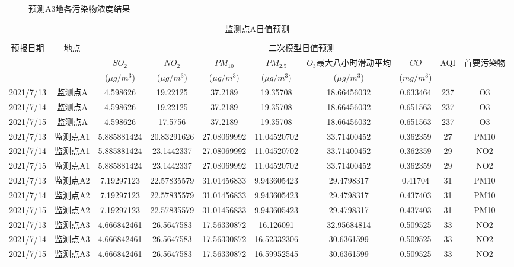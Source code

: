 \documentclass[a4paper,10pt]{my_paper}
\numberwithin{equation}{section}
\begin{document}
\begin{figure}[htbp]
\begin{minipage}[c]{0.3\textwidth}
		\end{minipage}
\caption{预测A3地各污染物浓度结果}\label{fig_Q3A3地预测图}
\end{figure}

\begin{table}[htbp]
  \centering\footnotesize
  \caption{监测点A日值预测}\label{tab_Q4_AQI}%
    \begin{tabular}{cccccccccc}
    \toprule
    \multirow{3}[2]{*}{预报日期} & \multirow{3}[2]{*}{地点} & \multicolumn{8}{c}{二次模型日值预测} \\
          &       & ${SO_2}$   & ${NO_2}$   & ${PM_10}$  & ${PM_{2.5}}$  & ${O_3}$最大八小时滑动平均 & ${CO}$    & \multicolumn{1}{c}{\multirow{2}[1]{*}{AQI}} & \multicolumn{1}{c}{\multirow{2}[1]{*}{首要污染物}} \\
          &       & (${\mu g/m^3}$) & (${\mu g/m^3}$) & (${\mu g/m^3}$) & (${\mu g/m^3}$) &  (${\mu g/m^3}$) &  (${mg/m^3}$) &       &  \\
    \midrule
    2021/7/13 & 监测点A  & 4.598626 & 19.22125 & 37.2189 & 19.35708 & 18.66456032 & 0.633464 & 237   & O3 \\
    2021/7/14 & 监测点A  & 4.598626 & 19.22125 & 37.2189 & 19.35708 & 18.66456032 & 0.651563 & 237   & O3 \\
    2021/7/15 & 监测点A  & 4.598626 & 17.5756 & 37.2189 & 19.35708 & 18.66456032 & 0.651563 & 237   & O3 \\
    2021/7/13 & 监测点A1 & 5.885881424 & 20.83291626 & 27.08069992 & 11.04520702 & 33.71400452 & 0.362359 & 27    & PM10 \\
    2021/7/14 & 监测点A1 & 5.885881424 & 23.1442337 & 27.08069992 & 11.04520702 & 33.71400452 & 0.362359 & 29    & NO2 \\
    2021/7/15 & 监测点A1 & 5.885881424 & 23.1442337 & 27.08069992 & 11.04520702 & 33.71400452 & 0.362359 & 29    & NO2 \\
    2021/7/13 & 监测点A2 & 7.19297123 & 22.57835579 & 31.01456833 & 9.943605423 & 29.4798317 & 0.41704 & 31    & PM10 \\
    2021/7/14 & 监测点A2 & 7.19297123 & 22.57835579 & 31.01456833 & 9.943605423 & 29.4798317 & 0.437403 & 31    & PM10 \\
    2021/7/15 & 监测点A2 & 7.19297123 & 22.57835579 & 31.01456833 & 9.943605423 & 29.4798317 & 0.437403 & 31    & PM10 \\
    2021/7/13 & 监测点A3 & 4.666842461 & 26.5647583 & 17.56330872 & 16.126091 & 32.95684814 & 0.509525 & 33    & NO2 \\
    2021/7/14 & 监测点A3 & 4.666842461 & 26.5647583 & 17.56330872 & 16.52332306 & 30.6361599 & 0.509525 & 33    & NO2 \\
    2021/7/15 & 监测点A3 & 4.666842461 & 26.5647583 & 17.56330872 & 16.59952545 & 30.6361599 & 0.509525 & 33    & NO2 \\
    \bottomrule
    \end{tabular}%
\end{table}%
\end{document}
